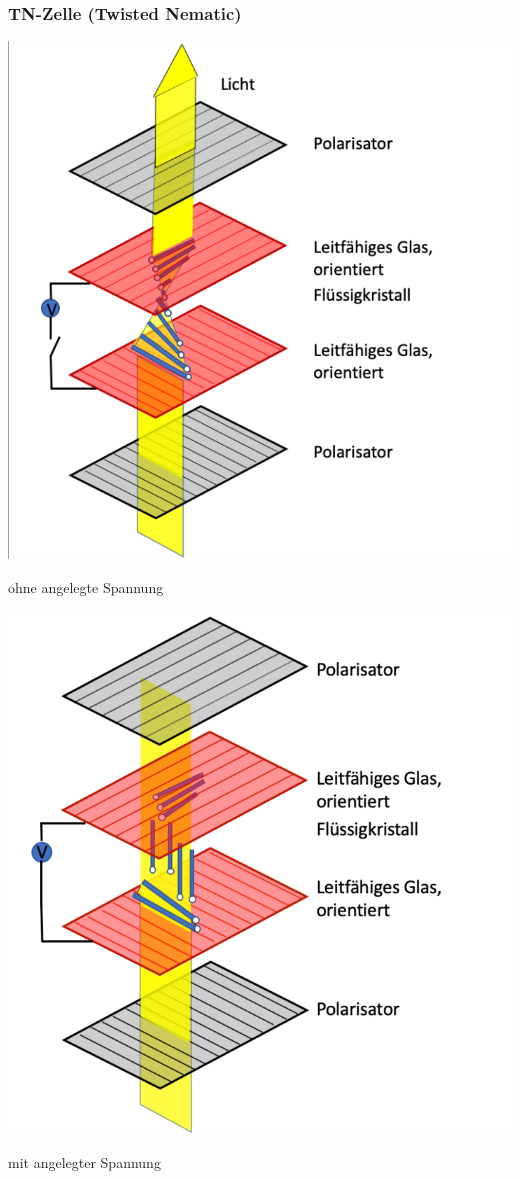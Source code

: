 \subsubsection{TN-Zelle (Twisted Nematic)}
\begin{minipage}{0.45\linewidth}
	\begin{center}
		\includegraphics[width=0.7\linewidth]{images/TN-Zelle1.png}
		
		ohne angelegte Spannung   
	\end{center}
\end{minipage}
\hfill
\begin{minipage}{0.45\linewidth}
	\begin{center}
		\includegraphics[width=0.7\linewidth]{images/TN-Zelle2.png} 
		
		mit angelegter Spannung 
	\end{center}
\end{minipage}
